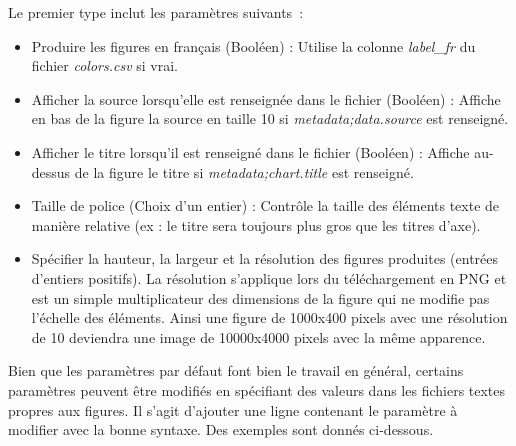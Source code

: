 \documentclass[11pt]{article}
\begin{document}
Le premier type inclut les paramètres suivants :
\begin{itemize}
    \item Produire les figures en français (Booléen) : Utilise la colonne \textit{label\_fr} du fichier \textit{colors.csv} si vrai.
    \item Afficher la source lorsqu'elle est renseignée dans le fichier (Booléen) : Affiche en bas de la figure la source en taille 10 si \textit{metadata;data.source} est renseigné.
    \item Afficher le titre lorsqu'il est renseigné dans le fichier (Booléen) : Affiche au-dessus de la figure le titre si \textit{metadata;chart.title} est renseigné.
    \item Taille de police (Choix d'un entier) : Contrôle la taille des éléments texte de manière relative (ex : le titre sera toujours plus gros que les titres d'axe).
    \item Spécifier la hauteur, la largeur et la résolution des figures produites (entrées d'entiers positifs). La résolution s'applique lors du téléchargement en PNG et est un simple multiplicateur des dimensions de la figure qui ne modifie pas l'échelle des éléments. Ainsi une figure de 1000x400 pixels avec une résolution de 10 deviendra une image de 10000x4000 pixels avec la même apparence.
\end{itemize}
\vspace{0.2cm}
Bien que les paramètres par défaut font bien le travail en général, certains paramètres peuvent être modifiés en spécifiant des valeurs dans les fichiers textes propres aux figures. Il s'agit d'ajouter une ligne contenant le paramètre à modifier avec la bonne syntaxe. Des exemples sont donnés ci-dessous.
\end{document}
